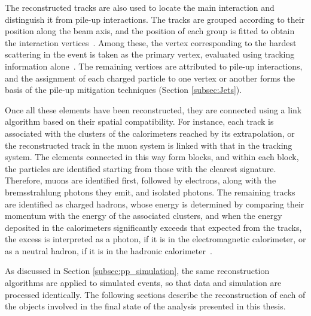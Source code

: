 The reconstructed tracks are also used to locate the main interaction and distinguish it from pile-up interactions. The tracks are grouped according to their position along the beam axis, and the position of each group is fitted to obtain the interaction vertices~\cite{CMS:2014pgm}. Among these, the vertex corresponding to the hardest scattering in the event is taken as the primary vertex, evaluated using tracking information alone~\cite{CMS-TDR-15-02}. The remaining vertices are attributed to pile-up interactions, and the assignment of each charged particle to one vertex or another forms the basis of the pile-up mitigation techniques (Section \ref{subsec:Jets}).

Once all these elements have been reconstructed, they are connected using a link algorithm based on their spatial compatibility. For instance, each track is associated with the clusters of the calorimeters reached by its extrapolation, or the reconstructed track in the muon system is linked with that in the tracking system. The elements connected in this way form blocks, and within each block, the particles are identified starting from those with the clearest signature. Therefore, muons are identified first, followed by electrons, along with the bremsstrahlung photons they emit, and isolated photons. The remaining tracks are identified as charged hadrons, whose energy is determined by comparing their momentum with the energy of the associated clusters, and when the energy deposited in the calorimeters significantly exceeds that expected from the tracks, the excess is interpreted as a photon, if it is in the electromagnetic calorimeter, or as a neutral hadron, if it is in the hadronic calorimeter~\cite{CMS:2017yfk}.

As discussed in Section \ref{subsec:pp_simulation}, the same reconstruction algorithms are applied to simulated events, so that data and simulation are processed identically. The following sections describe the reconstruction of each of the objects involved in the final state of the analysis presented in this thesis.


